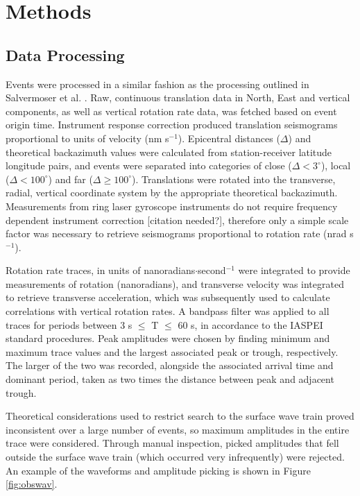 \documentclass{gji}
\begin{document}
\section{Methods}
\subsection{Data Processing}\label{sec:dataproc}
Events were processed in a similar fashion as the processing outlined in Salvermoser et al. . 
Raw, continuous translation data in North, East and vertical components, as well as vertical rotation rate data, was fetched based on event origin time. Instrument response correction produced translation seismograms proportional to units of velocity (nm s$^{-1}$). Epicentral distances ($\Delta$) and theoretical backazimuth values were calculated from station-receiver latitude longitude pairs, and events were separated into categories of close ($\Delta < 3^\circ$), local ($\Delta <100^\circ$) and far ($\Delta \ge 100^\circ$). Translations were rotated into the transverse, radial, vertical coordinate system by the appropriate theoretical backazimuth. Measurements from ring laser gyroscope instruments do not require frequency dependent instrument correction [citation needed?],
therefore only a simple scale factor was necessary to retrieve seismograms proportional to rotation rate (nrad s$^{-1}$). 

Rotation rate traces, in units of nanoradians$\cdot$second$^{-1}$ were integrated to provide measurements of rotation (nanoradians), and transverse velocity was integrated to retrieve transverse acceleration, which was subsequently used to calculate correlations with vertical rotation rates.
A bandpass filter was applied to all traces for periods between 3 s $\le$ T $\le$ 60 s, in accordance to the IASPEI standard procedures. Peak amplitudes were chosen by finding minimum and maximum trace values and the largest associated peak or trough, respectively. The larger of the two was recorded, alongside the associated arrival time and dominant period, taken as two times the distance between peak and adjacent trough. 

Theoretical considerations used to restrict search to the surface wave train proved inconsistent over a large number of events, so maximum amplitudes in the entire trace were considered. Through manual inspection, picked amplitudes that fell outside the surface wave train (which occurred very infrequently) were rejected. An example of the waveforms and amplitude picking is shown in Figure \ref{fig:obswav}.
\end{document}
